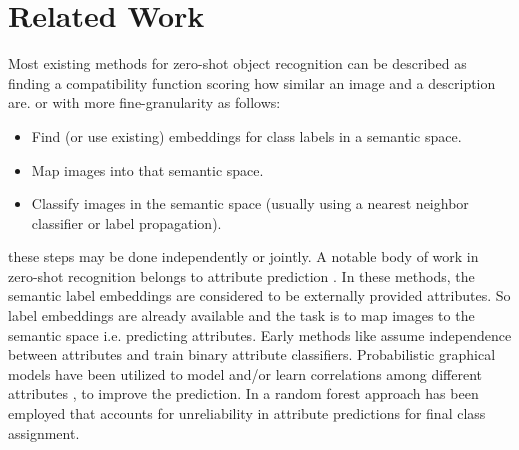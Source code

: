 \section{Related Work} \label{related}
Most existing methods for zero-shot object recognition can be described as finding a compatibility function scoring how
similar an image and a description are.
or with more fine-granularity as follows:
\begin{itemize}
  \item Find (or use existing) embeddings for class labels in a semantic space.
  \item Map images into that semantic space.
  \item Classify images in the semantic space (usually using a nearest neighbor classifier or label propagation).
\end{itemize}
these steps may be done independently or jointly.
A notable body of work in zero-shot recognition belongs to attribute prediction  \cite{lampert09, topicmodel, ajoint11, unified13, suzuki14}.
In these methods, the semantic label embeddings are considered to be externally provided attributes. So label embeddings are
already available and the task is to map images to the semantic space i.e. predicting attributes.
Early methods like \cite{lampert09} assume independence between attributes and train binary attribute classifiers.
Probabilistic graphical models have been utilized to model and/or learn correlations among different attributes \cite{topicmodel, unified13}, to improve the prediction.
In \cite{jayaraman14}  a random forest approach has been employed that accounts for unreliability in attribute predictions
 for final class assignment.


